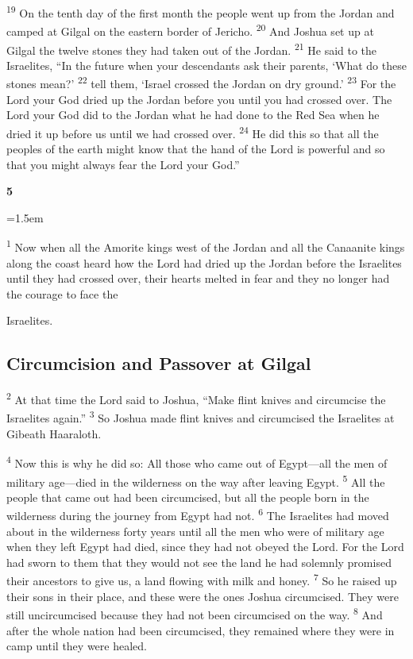 \documentclass[12pt,twoside]{article}
\newcommand{\vs}[1]{\textsuperscript{#1}}
\newcommand{\chapterWithIndent}[2]{%
  \noindent
  \begin{minipage}[t]{1cm}
    \vspace{-0.4\baselineskip}
    {\fontsize{40pt}{48pt}\selectfont \textbf{#1}}
  \end{minipage}%
  \hspace{0.3cm}%
  \begin{minipage}[t]{\dimexpr\linewidth - 1.5cm - 0.3cm\relax}
    \hangindent=1.5em
    \hangafter=3
    #2
    \vspace{0.1cm}
  \end{minipage}
}
\begin{document}
\vs{19} On the tenth day of the first month the people went up from the Jordan and camped at Gilgal on the eastern border of Jericho.
\vs{20} And Joshua set up at Gilgal the twelve stones they had taken out of the Jordan.
\vs{21} He said to the Israelites, ``In the future when your descendants ask their parents, `What do these stones mean?'
\vs{22} tell them, `Israel crossed the Jordan on dry ground.'
\vs{23} For the Lord your God dried up the Jordan before you until you had crossed over. The Lord your God did to the Jordan what he had done to the Red Sea when he dried it up before us until we had crossed over.
\vs{24} He did this so that all the peoples of the earth might know that the hand of the Lord is powerful and so that you might always fear the Lord your God.''

\chapterWithIndent{5}{
  \vs{1} Now when all the Amorite kings west of the Jordan and all the Canaanite kings along the coast heard how the Lord had dried up the Jordan before the Israelites until they had crossed over, their hearts melted in fear and they no longer had the courage to face the
}

\noindent Israelites.

\subsection*{\textbf{Circumcision and Passover at Gilgal}}
\vs{2} At that time the Lord said to Joshua, ``Make flint knives and circumcise the Israelites again.''
\vs{3} So Joshua made flint knives and circumcised the Israelites at Gibeath Haaraloth.

\vs{4} Now this is why he did so: All those who came out of Egypt---all the men of military age---died in the wilderness on the way after leaving Egypt.
\vs{5} All the people that came out had been circumcised, but all the people born in the wilderness during the journey from Egypt had not.
\vs{6} The Israelites had moved about in the wilderness forty years until all the men who were of military age when they left Egypt had died, since they had not obeyed the Lord. For the Lord had sworn to them that they would not see the land he had solemnly promised their ancestors to give us, a land flowing with milk and honey.
\vs{7} So he raised up their sons in their place, and these were the ones Joshua circumcised. They were still uncircumcised because they had not been circumcised on the way.
\vs{8} And after the whole nation had been circumcised, they remained where they were in camp until they were healed.
\end{document}
